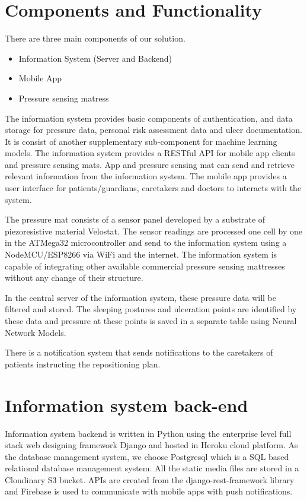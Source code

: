\section{Components and Functionality}

There are three main components of our solution. 
\begin{itemize}
	\item Information System (Server and Backend)
	\item Mobile App
	\item Pressure sensing matress
\end{itemize}


The information system provides basic components of authentication, and data storage for pressure data, personal risk assessment data and ulcer documentation. It is consist of another supplementary sub-component for machine learning models. The information system provides a RESTful API for mobile app clients and pressure sensing mats. App and pressure sensing mat can send and retrieve relevant information from the information system. The mobile app provides a user interface for patients/guardians, caretakers and doctors to interacts with the system.

The pressure mat consists of a sensor panel developed by a substrate of piezoresistive material Velostat\textsuperscript{\textregistered}. The sensor readings are processed one cell by one in the ATMega32\textsuperscript{\textregistered} microcontroller and send to the information system using a NodeMCU/ESP8266\textsuperscript{\textregistered} via WiFi and the internet. The information system is capable of integrating other available commercial pressure sensing mattresses without any change of their structure.

In the central server of the information system, these pressure data will be filtered and stored. The sleeping postures and ulceration points are identified by these data and pressure at these points is saved in a separate table using Neural Network Models.

There is a notification system that sends notifications to the caretakers of patients instructing the repositioning plan.


\section{Information system back-end}

Information system backend is written in Python using the enterprise level full stack web designing framework Django\textsuperscript{\textregistered} and hosted in Heroku\textsuperscript{\textregistered} cloud platform. As the database management system, we choose Postgresql which is a SQL based relational database management system. All the static media files are stored in a Cloudinary S3 bucket\textsuperscript{\textregistered}. APIs are created from the django-rest-framework library and Firebase\textsuperscript{\textregistered} is used to communicate with mobile apps with push notifications. 

